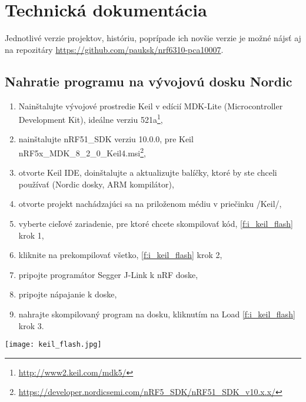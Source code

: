 \documentclass[12pt,a4wide,oneside,openright]{report}
\begin{document}


\chapter{Technická dokumentácia} \label{s_manual}
Jednotlivé verzie projektov, históriu, poprípade ich novšie verzie je možné nájsť aj na repozitáry \url{https://github.com/pauksk/nrf6310-pca10007}.

	\section{Nahratie programu na vývojovú dosku Nordic} \label{s_nrf_program}
 \begin{enumerate}
 	\item Nainštalujte vývojové prostredie Keil v edícií MDK-Lite (Microcontroller Development Kit), ideálne verziu 521a\footnote{\url{http://www2.keil.com/mdk5/}},
 	\item nainštalujte nRF51\_SDK verziu 10.0.0, pre Keil nRF5x\_MDK\_8\_2\_0\_Keil4.msi\footnote{\url{https://developer.nordicsemi.com/nRF5_SDK/nRF51_SDK_v10.x.x/}},
 	\item otvorte Keil IDE, doinštalujte a aktualizujte balíčky, ktoré by ste chceli používať (Nordic dosky, ARM kompilátor),
 	\item otvorte projekt nachádzajúci sa na priloženom médiu v priečinku /Keil/,
 	\item vyberte cieľové zariadenie, pre ktoré chcete skompilovať kód,  \ref{f:i_keil_flash} krok 1,
 	\item kliknite na prekompilovať všetko,  \ref{f:i_keil_flash} krok 2,
 	\item pripojte programátor Segger J-Link k nRF doske,
 	\item pripojte nápajanie k doske,
 	\item nahrajte skompilovaný program na dosku, kliknutím na Load \ref{f:i_keil_flash} krok 3.
 \end{enumerate}
 
 \begin{figure*}[!htb]
 	\centering
 	\texttt{[image: keil\_flash.jpg]}
 	\caption{Nahratie programu na vývojovú dosku.}
 	\label{f:i_keil_flash}
 \end{figure*}
 
 \newpage
 
\end{document}
